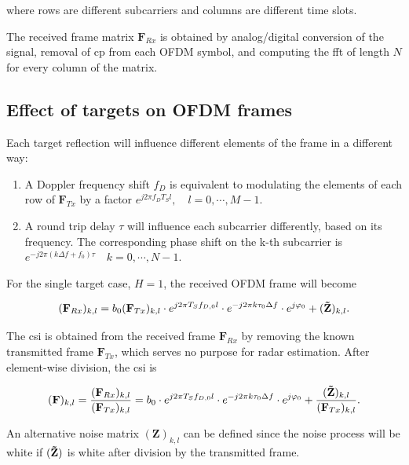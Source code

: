     where rows are different subcarriers and columns are different time slots.
    
    The received frame matrix $\mathbf F_{Rx}$ is obtained by analog/digital conversion of the signal, removal of \gls{cp} from each OFDM symbol, and computing the \gls{fft} of length $N$ for every column of the matrix.
    
    \subsection{Effect of targets on OFDM frames}
    Each target reflection will influence different elements of the frame in a different way:
    
    \begin{enumerate}
        \item A Doppler frequency shift $f_D$ is equivalent to modulating the elements of each row of $\mathbf F_{Tx}$ by a factor $e^{j2\pi f_D T_S l},\quad  l = 0, \cdots, M-1$.
        \item A round trip delay $\tau$ will influence each subcarrier differently, based on its frequency. The corresponding phase shift on the k-th subcarrier is $e^{-j2\pi (k\Delta f + f_0)\tau} \quad  k = 0, \cdots, N-1$.
    \end{enumerate}
    
    For the single target case, $H=1$, the received OFDM frame will become
    
    \begin{equation*}
        (\mathbf F_{Rx})_{k,l} = b_0(\mathbf F_{Tx})_{k,l} \cdot e^{j2\pi T_S f_{D,0} l}\cdot e^{-j2\pi k \tau_0 \Delta f} \cdot e^{j\varphi_0} + (\mathbf{\Tilde{Z}})_{k,l}.
    \end{equation*}
    
    The \gls{csi} is obtained from the received frame $\mathbf{F}_{Rx}$ by removing the known transmitted frame $\mathbf{F}_{Tx}$, which serves no purpose for radar estimation. After element-wise division, the \gls{csi} is
    
    \begin{equation}
        (\mathbf F)_{k,l} = \frac{(\mathbf F_{Rx})_{k,l}}{(\mathbf F_{Tx})_{k,l}} = b_0 \cdot e^{j2\pi T_S f_{D,0} l}\cdot e^{-j2\pi k \tau_0 \Delta f} \cdot e^{j\varphi_0} + \frac{(\mathbf{\Tilde{Z}})_{k,l}}{(\mathbf F_{Tx})_{k,l}}\label{eq:CSI_frame}.    
    \end{equation}
    
    An alternative noise matrix $(\mathbf{Z})_{k,l}$ can be defined since the noise process will be white if $(\mathbf{\Tilde{Z}})$ is white after division by the transmitted frame.
    
